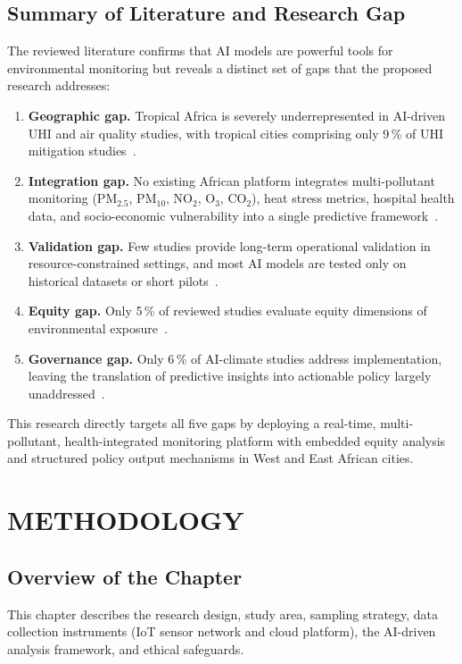 \documentclass[12pt,a4paper]{report}
\begin{document}
\section{Summary of Literature and Research Gap}
The reviewed literature confirms that AI models are powerful tools for environmental monitoring but reveals a distinct set of gaps that the proposed research addresses:
\begin{enumerate}
  \item \textbf{Geographic gap.} Tropical Africa is severely underrepresented in AI-driven UHI and air quality studies, with tropical cities comprising only 9\,\% of UHI mitigation studies~\cite{gaur2026}.
  \item \textbf{Integration gap.} No existing African platform integrates multi-pollutant monitoring (PM$_{2.5}$, PM$_{10}$, NO$_2$, O$_3$, CO$_2$), heat stress metrics, hospital health data, and socio-economic vulnerability into a single predictive framework~\cite{bainomugisha2024}.
  \item \textbf{Validation gap.} Few studies provide long-term operational validation in resource-constrained settings, and most AI models are tested only on historical datasets or short pilots~\cite{ikegwu2026}.
  \item \textbf{Equity gap.} Only 5\,\% of reviewed studies evaluate equity dimensions of environmental exposure~\cite{gaur2026}.
  \item \textbf{Governance gap.} Only 6\,\% of AI-climate studies address implementation, leaving the translation of predictive insights into actionable policy largely unaddressed~\cite{mehryar2024}.
\end{enumerate}
This research directly targets all five gaps by deploying a real-time, multi-pollutant, health-integrated monitoring platform with embedded equity analysis and structured policy output mechanisms in West and East African cities.



\chapter{METHODOLOGY}

\section{Overview of the Chapter}
This chapter describes the research design, study area, sampling strategy, data collection instruments (IoT sensor network and cloud platform), the AI-driven analysis framework, and ethical safeguards.
\end{document}

